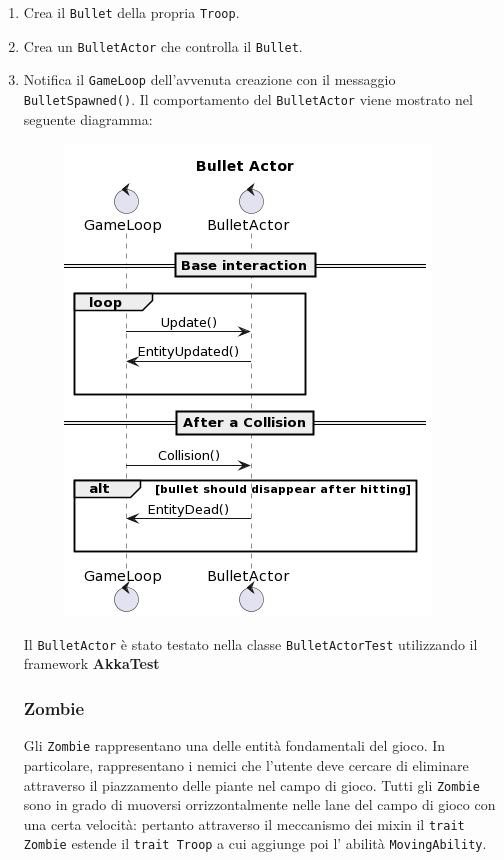 \begin{enumerate}
    \item Crea il \texttt{Bullet} della propria \texttt{Troop}.
    \item Crea un \texttt{BulletActor} che controlla il \texttt{Bullet}.
    \item Notifica il \texttt{GameLoop} dell'avvenuta creazione con il messaggio \texttt{BulletSpawned()}.
    \newpage
    Il comportamento del \texttt{BulletActor} viene mostrato nel seguente diagramma:
    \begin{figure}[H]
        \centering
        \includegraphics[width=\linewidth]{images/bullet-actor.png}
        \label{Diagramma di sequenza del Troop Actor.}
    \end{figure}

    Il \texttt{BulletActor} è stato testato nella classe \texttt{BulletActorTest} utilizzando il framework \textbf{AkkaTest}

    \subsubsection{Zombie}
    Gli \texttt{Zombie} rappresentano una delle entità fondamentali del gioco. In particolare, rappresentano i nemici che l'utente
    deve cercare di eliminare attraverso il piazzamento delle piante nel campo di gioco.
    Tutti gli \texttt{Zombie} sono in grado di muoversi orrizzontalmente nelle lane del campo di gioco con una certa velocità: pertanto
    attraverso il meccanismo dei mixin il \texttt{trait Zombie} estende il \texttt{trait Troop} a cui aggiunge poi l' abilità \texttt{MovingAbility}.


\end{enumerate}
